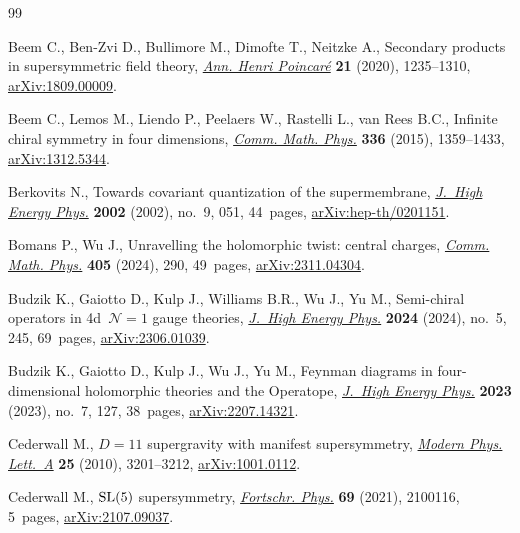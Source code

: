 \documentclass[pdftex]{sigma}
\numberwithin{equation}{section}
\theoremstyle{definition}
\begin{document}
\begin{thebibliography}{99}
\footnotesize\itemsep=0pt

Beem C., Ben-Zvi D., Bullimore M., Dimofte T., Neitzke A., Secondary products
 in supersymmetric field theory,
 \href{https://doi.org/10.1007/s00023-020-00888-3}{\textit{Ann. Henri
 Poincar\'e}} \textbf{21} (2020), 1235--1310,
 \href{http://arxiv.org/abs/1809.00009}{arXiv:1809.00009}.

Beem C., Lemos M., Liendo P., Peelaers W., Rastelli L., van Rees B.C., Infinite
 chiral symmetry in four dimensions,
 \href{https://doi.org/10.1007/s00220-014-2272-x}{\textit{Comm. Math. Phys.}}
 \textbf{336} (2015), 1359--1433,
 \href{http://arxiv.org/abs/1312.5344}{arXiv:1312.5344}.

Berkovits N., Towards covariant quantization of the supermembrane,
 \href{https://doi.org/10.1088/1126-6708/2002/09/051}{\textit{J.~High Energy
 Phys.}} \textbf{2002} (2002), no.~9, 051, 44~pages,
 \href{http://arxiv.org/abs/hep-th/0201151}{arXiv:hep-th/0201151}.

Bomans P., Wu J., Unravelling the holomorphic twist: central charges,
 \href{https://doi.org/10.1007/s00220-024-05167-4}{\textit{Comm. Math. Phys.}}
 \textbf{405} (2024), 290, 49~pages,
 \href{http://arxiv.org/abs/2311.04304}{arXiv:2311.04304}.

Budzik K., Gaiotto D., Kulp J., Williams B.R., Wu J., Yu M., Semi-chiral
 operators in 4d~{$\mathcal{N} = 1$} gauge theories,
 \href{https://doi.org/10.1007/jhep05(2024)245}{\textit{J.~High Energy Phys.}}
 \textbf{2024} (2024), no.~5, 245, 69~pages,
 \href{http://arxiv.org/abs/2306.01039}{arXiv:2306.01039}.

Budzik K., Gaiotto D., Kulp J., Wu J., Yu M., Feynman diagrams in
 four-dimensional holomorphic theories and the {O}peratope,
 \href{https://doi.org/10.1007/jhep07(2023)127}{\textit{J.~High Energy Phys.}}
 \textbf{2023} (2023), no.~7, 127, 38~pages,
 \href{http://arxiv.org/abs/2207.14321}{arXiv:2207.14321}.

Cederwall M., {$D=11$} supergravity with manifest supersymmetry,
 \href{https://doi.org/10.1142/S0217732310034407}{\textit{Modern Phys.
 Lett.~A}} \textbf{25} (2010), 3201--3212,
 \href{http://arxiv.org/abs/1001.0112}{arXiv:1001.0112}.

Cederwall M., {${\rm SL}(5)$} supersymmetry,
 \href{https://doi.org/10.1002/prop.202100116}{\textit{Fortschr. Phys.}}
 \textbf{69} (2021), 2100116, 5~pages,
 \href{http://arxiv.org/abs/2107.09037}{arXiv:2107.09037}.


\end{thebibliography}
\end{document}
